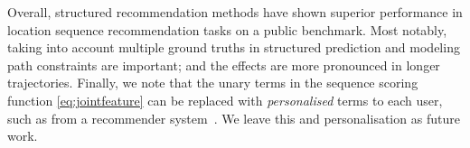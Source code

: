Overall, structured recommendation methods have shown superior performance in location sequence recommendation tasks on a public benchmark. Most notably, taking into account multiple ground truths in structured prediction and modeling path constraints are important; and the effects are more pronounced in longer trajectories.
Finally, we note that the unary terms in the sequence scoring function \eqref{eq:jointfeature} can be replaced with {\em personalised} terms to each user, such as from a recommender system~\cite{Koren:2009,bpr09}. We leave this and personalisation as future work.


